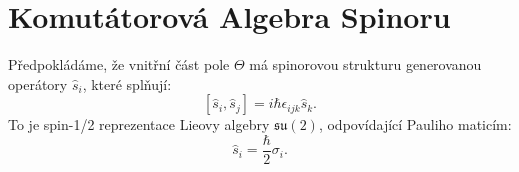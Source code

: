 \documentclass{article}
\begin{document}
\section*{Komutátorová Algebra Spinoru}

Předpokládáme, že vnitřní část pole \(\Theta\) má spinorovou strukturu generovanou operátory \(\hat{s}_i\), které splňují:
\[
[\hat{s}_i, \hat{s}_j] = i \hbar \epsilon_{ijk} \hat{s}_k.
\]
To je spin-1/2 reprezentace Lieovy algebry \(\mathfrak{su}(2)\), odpovídající Pauliho maticím:
\[
\hat{s}_i = \frac{\hbar}{2} \sigma_i.
\]
\end{document}
